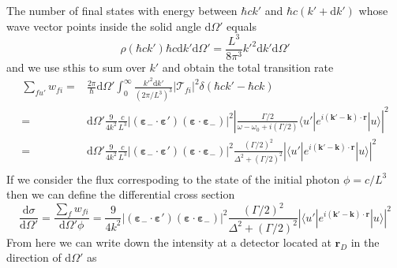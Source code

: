 \documentclass[11pt,letter]{article}
\newcommand{\bv}[1]{\ensuremath{\bm{#1}}}
\begin{document}
The number of final states with energy between $\hbar c k'$ and $\hbar c ( k' + \mathrm{d}k')$  whose wave vector points inside the solid angle $\mathrm{d} \Omega'$ equals 
\begin{equation}
    \rho( \hbar c k') \hbar c \mathrm{d} k' \mathrm{d} \Omega ' = \frac{L^{3}}{8 \pi^{3} }  k'^{2} \mathrm{d} k' \mathrm{d} \Omega' 
\end{equation}
and we use sthis to sum over $k'$ and obtain the total transition rate 
\begin{equation}
\begin{split}
  \sum_{fu'} w_{fi} = & 
   \frac{2\pi}{\hbar}  \mathrm{d} \Omega' 
      \int_{0}^{\infty} \frac{k'^{2} \mathrm{d} k' }{ (2\pi / L^{3} ) ^{3} } 
   | \mathcal{T}_{fi} |^{2} 
   \delta( \hbar c k' - \hbar c k )  \\ 
   = & 
   \mathrm{d} \Omega' \frac{9}{4 k^{2}} \frac{ c } {L^{3} }
        |(\bv{\varepsilon}_{-}\cdot \bv{\varepsilon}' )
                       (\bv{\varepsilon}\cdot \bv{\varepsilon}_{-} ) |^{2}
    \left|
    \frac{ \Gamma/2  }
        { \omega - \omega_{0} + i (\Gamma/2 ) }  
      \langle u' | e^{i(\bv{k}'-\bv{k}) \cdot\bv{r}} | u  \rangle
     \right| ^{2} \\ 
   = & 
   \mathrm{d} \Omega' \frac{9}{4 k^{2}} \frac{ c } {L^{3} }
        |(\bv{\varepsilon}_{-}\cdot \bv{\varepsilon}' )
                       (\bv{\varepsilon}\cdot \bv{\varepsilon}_{-} ) |^{2}
    \frac{ (\Gamma/2)^{2}  }
        { \Delta^{2} +  (\Gamma/2 )^{2} }
    \left|
      \langle u' | e^{i(\bv{k}'-\bv{k}) \cdot\bv{r}} | u  \rangle
\right| ^{2} \\ 
\end{split} 
\end{equation}
If we consider the flux correspoding to the state of the initial photon $\phi = c/L^{3}$ then we can define the differential cross section 
\begin{equation}
 \frac{ \mathrm{d} \sigma } { \mathrm{d} \Omega'} =  
    \frac{\sum_{f} w_{fi} } { \mathrm{d} \Omega' \phi} = 
    \frac{9}{4 k^{2}} 
        |(\bv{\varepsilon}_{-}\cdot \bv{\varepsilon}' )
                       (\bv{\varepsilon}\cdot \bv{\varepsilon}_{-} ) |^{2}
    \frac{ (\Gamma/2)^{2}  }
        { \Delta^{2} +  (\Gamma/2 )^{2} }
    \left|
      \langle u' | e^{i(\bv{k}'-\bv{k}) \cdot\bv{r}} | u  \rangle
\right| ^{2}  
\end{equation}
From here we can write down the intensity at a detector located at $\bv{r}_{D}$ in the direction of $\mathrm{d} \Omega'$ as 
\end{document}
